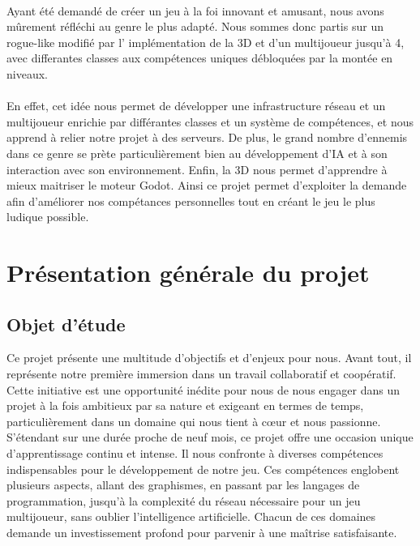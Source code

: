 \documentclass{article}
\begin{document}
\paragraph{}
Ayant \'et\'e demand\'e de cr\'eer un jeu \`a la foi innovant et amusant, nous avons m\^urement r\'efl\'echi au genre le plus adapt\'e. Nous sommes donc partis sur un rogue-like modifi\'e par l' impl\'ementation de la 3D et d'un multijoueur jusqu'\`a 4, avec differantes classes aux comp\'etences uniques d\'ebloqu\'ees par la mont\'ee en niveaux. 

\paragraph{}
En effet, cet id\'ee nous permet de d\'evelopper une infrastructure r\'eseau et un multijoueur enrichie par diff\'erantes classes et un syst\`eme de comp\'etences, et nous apprend \`a relier notre projet \`a des serveurs. De plus, le grand nombre d'ennemis dans ce genre se pr\`ete particuli\`erement bien au d\'eveloppement d'IA et à son interaction avec son environnement. Enfin, la 3D nous permet d'apprendre \`a mieux maitriser le moteur Godot. Ainsi ce projet permet d'exploiter la demande afin d'am\'eliorer nos comp\'etances personnelles tout en cr\'eant le jeu le plus ludique possible.


\section{Présentation générale du projet}
\subsection{Objet d'étude}
Ce projet présente une multitude d'objectifs et d'enjeux pour nous. Avant tout, il représente notre première immersion dans un travail collaboratif et coopératif. Cette initiative est une opportunité inédite pour nous de nous engager dans un projet à la fois ambitieux par sa nature et exigeant en termes de temps, particulièrement dans un domaine qui nous tient à cœur et nous passionne.\\

S'étendant sur une durée proche de neuf mois, ce projet offre une occasion unique d'apprentissage continu et intense. Il nous confronte à diverses compétences indispensables pour le développement de notre jeu. Ces compétences englobent plusieurs aspects, allant des graphismes, en passant par les langages de programmation, jusqu'à la complexité du réseau nécessaire pour un jeu multijoueur, sans oublier l'intelligence artificielle. Chacun de ces domaines demande un investissement profond pour parvenir à une maîtrise satisfaisante.\\
\end{document}
